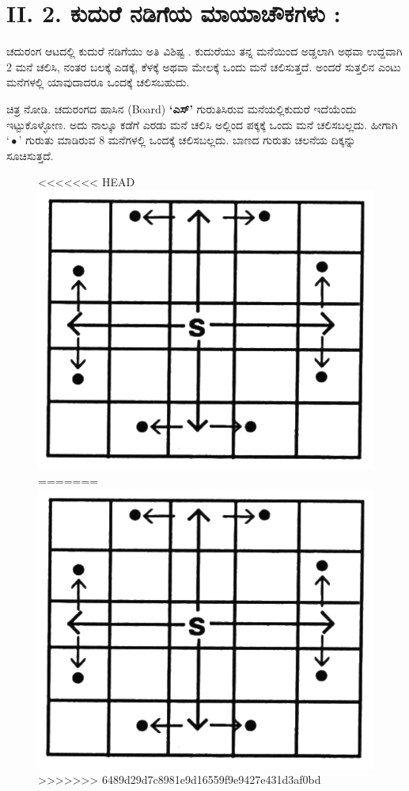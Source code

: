 \section*{II. 2. ಕುದುರೆ ನಡಿಗೆಯ ಮಾಯಾಚೌಕಗಳು :}

ಚದುರಂಗ ಆಟದಲ್ಲಿ ಕುದುರೆ ನಡಿಗೆಯು ಅತಿ ವಿಶಿಷ್ಟ . ಕುದುರೆಯು ತನ್ನ ಮನೆಯಿಂದ ಅಡ್ಡಲಾಗಿ ಅಥವಾ ಉದ್ದವಾಗಿ 2 ಮನೆ ಚಲಿಸಿ, ನಂತರ ಬಲಕ್ಕೆ ಎಡಕ್ಕೆ, ಕೆಳಕ್ಕೆ ಅಥವಾ ಮೇಲಕ್ಕೆ ಒಂದು ಮನೆ ಚಲಿಸುತ್ತದೆ. ಅಂದರೆ ಸುತ್ತಲಿನ ಎಂಟು ಮನೆಗಳಲ್ಲಿ ಯಾವುದಾದರೂ ಒಂದಕ್ಕೆ ಚಲಿಸಬಹುದು.

ಚಿತ್ರ ನೋಡಿ. ಚದುರಂಗದ ಹಾಸಿನ (Board) \textbf{‘ಎಸ್’} ಗುರುತಿಸಿರುವ ಮನೆಯಲ್ಲಿ\break ಕುದುರೆ ಇದೆಯೆಂದು ಇಟ್ಟುಕೊಳ್ಳೋಣ. ಅದು ನಾಲ್ಕೂ ಕಡೆಗೆ ಎರಡು ಮನೆ ಚಲಿಸಿ ಅಲ್ಲಿಂದ ಪಕ್ಕಕ್ಕೆ ಒಂದು ಮನೆ ಚಲಿಸಬಲ್ಲದು. ಹೀಗಾಗಿ $‘\bullet ’$ ಗುರುತು ಮಾಡಿರುವ 8 ಮನೆಗಳಲ್ಲಿ ಒಂದಕ್ಕೆ ಚಲಿಸಬಲ್ಲದು. ಬಾಣದ ಗುರುತು ಚಲನೆಯ ದಿಕ್ಕನ್ನು ಸೂಚಿಸುತ್ತದೆ.
\begin{figure}[H]
<<<<<<< HEAD
\includegraphics{src/figures/chap6/fig6-2.jpg}
=======
\includegraphics[scale=.85]{src/figures/chap6/fig6.2.jpg}
>>>>>>> 6489d29d7c8981e9d16559f9e9427e431d3af0bd
\end{figure}

